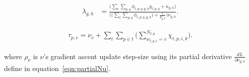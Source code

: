 \begin{align}
\lambda_{g,h} &= \frac{\bigg( \sum_{t} \! \sum_{p,q} \! \phi_{t,p,q,g,h} y_{t,p,q} + 
\kappa_{g,h} \bigg) }{
 \bigg( \bigg( \sum_{t} \! \sum_{p,q} \! \phi_{t,p,q,g,h} \bigg) + 
\frac{1}{\theta_{g,h}} \bigg) \nu_{g,h}}.
\label{eqn:lambdaUp}
\end{align}

\begin{align}
\tau_{p,v} = \nu_{v} + \sum_{t} \! \sum_{p \in t}
\bigg(\sum_{w_{t,p,i}=v}^{N_{t,p}} \chi_{t,p,i,k} \bigg).
\label{eqn:tauUp}
\end{align}


where $\rho_\nu$ is $\nu$'s gradient ascent update step-size using its partial
derivative $\frac{dL}{\partial\nu_{g,h}}$ define in equation~\ref{eqn:partialNu}.

